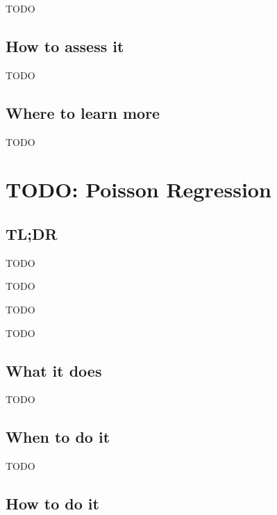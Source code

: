 \documentclass[
]{book}
\providecommand{\tightlist}{%
  \setlength{\itemsep}{0pt}\setlength{\parskip}{0pt}}
\begin{document}
TODO

\hypertarget{how-to-assess-it-7}{%
\section{How to assess it}\label{how-to-assess-it-7}}

TODO

\hypertarget{where-to-learn-more-7}{%
\section{Where to learn more}\label{where-to-learn-more-7}}

TODO

\hypertarget{poisson-regression}{%
\chapter{TODO: Poisson Regression}\label{poisson-regression}}

\hypertarget{tldr-8}{%
\section{TL;DR}\label{tldr-8}}

\begin{description}
\tightlist
\item[What it does]
TODO
\item[When to do it]
TODO
\item[How to do it]
TODO
\item[How to assess it]
TODO
\end{description}

\hypertarget{what-it-does-8}{%
\section{What it does}\label{what-it-does-8}}

TODO

\hypertarget{when-to-do-it-8}{%
\section{When to do it}\label{when-to-do-it-8}}

TODO

\hypertarget{how-to-do-it-8}{%
\section{How to do it}\label{how-to-do-it-8}}
\end{document}
